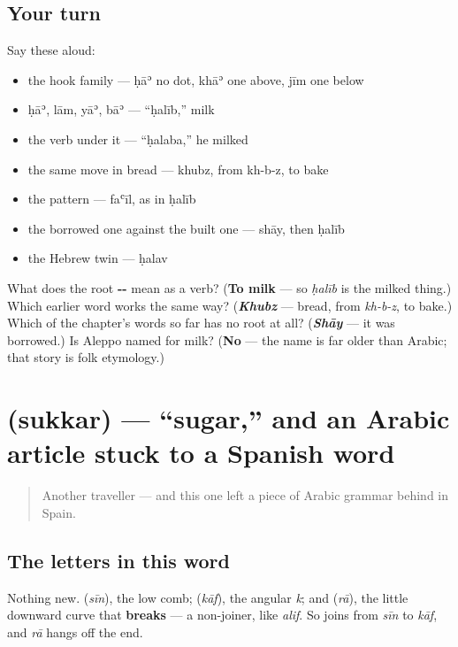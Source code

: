 \subsection*{Your turn}
Say these aloud:

\begin{itemize}
\raggedright
  \item the hook family — ḥāʾ no dot, khāʾ one above, jīm one below
  \item ḥāʾ, lām, yāʾ, bāʾ — \textquotedblleft{}ḥalīb,\textquotedblright{} milk
  \item the verb under it — \textquotedblleft{}ḥalaba,\textquotedblright{} he milked
  \item the same move in bread — khubz, from kh-b-z, to bake
  \item the pattern — faʿīl, as in ḥalīb
  \item the borrowed one against the built one — shāy, then ḥalīb
  \item the Hebrew twin — ḥalav
\end{itemize}

\begin{tcolorbox}[breakable,colback=teal!4,colframe=teal!35!black,title={Before you move on}]
What does the root \textbf{--} mean as a verb? (\textbf{To milk} — so \emph{ḥalīb} is the milked thing.) Which earlier word works the same way? (\emph{\textbf{Khubz}} — bread, from \emph{kh-b-z}, to bake.) Which of the chapter's words so far has no root at all? (\emph{\textbf{Shāy}} — it was borrowed.) Is Aleppo named for milk? (\textbf{No} — the name is far older than Arabic; that story is folk etymology.)
\end{tcolorbox}
\section[\texorpdfstring{\ar{سكر} (sukkar)}{سكر (sukkar)}]{ (sukkar) — \textquotedblleft{}sugar,\textquotedblright{} and an Arabic article stuck to a Spanish word}

\label{lesson:AR-C33-sukkar}



\begin{quote}
Another traveller — and this one left a piece of Arabic grammar behind in Spain.
\end{quote}

\subsection*{The letters in this word}
Nothing new. \textbf{} (\emph{sīn}), the low comb; \textbf{} (\emph{kāf}), the angular \emph{k}; and \textbf{} (\emph{rā}), the little downward curve that \textbf{breaks} — a non-joiner, like \emph{alif}. So \textbf{} joins from \emph{sīn} to \emph{kāf}, and \emph{rā} hangs off the end.

